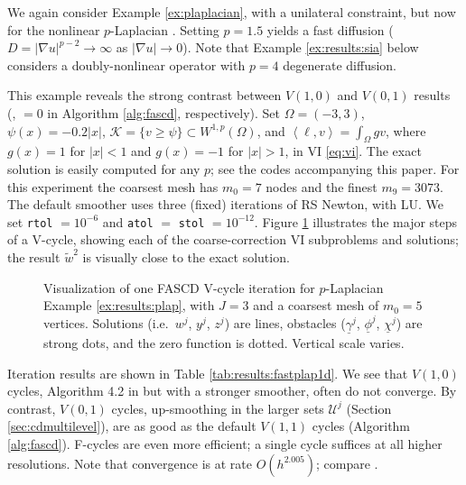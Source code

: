 \documentclass[review,hidelinks,onefignum,onetabnum]{siamart220329}
\newcommand{\grad}{\nabla}
\newcommand{\ip}[2]{\left<#1,#2\right>}
\begin{document}
\begin{example}  \label{ex:results:plap}
We again consider Example \ref{ex:plaplacian}, with a unilateral constraint, but now for the nonlinear $p$-Laplacian \cite{ChoeLewis1991}.  Setting $p=1.5$ yields a fast diffusion ($D=|\grad u|^{p-2}\to \infty$ as $|\grad u|\to 0$).  Note that Example \ref{ex:results:sia} below considers a doubly-nonlinear operator with $p=4$ degenerate diffusion.

This example reveals the strong contrast between $V(1,0)$ and $V(0,1)$ results (,  $=0$ in Algorithm \ref{alg:fascd}, respectively).  Set $\Omega=(-3,3)$, $\psi(x) = -0.2|x|$, $\mathcal{K} = \{v \ge \psi\} \subset W^{1,p}(\Omega)$, and $\ip\ell v = \int_\Omega g v$, where $g(x)=1$ for $|x|<1$ and $g(x)=-1$ for $|x|>1$, in VI \eqref{eq:vi}.  The exact solution is easily computed for any $p$; see the codes accompanying this paper.  For this experiment the coarsest mesh has $m_0=7$ nodes and the finest $m_9=3073$.  The default smoother uses three (fixed) iterations of RS Newton, with LU.  We set \texttt{rtol} $= 10^{-6}$ and \texttt{atol} $=$ \texttt{stol} $= 10^{-12}$.  Figure \ref{fig:imagesvcycle} illustrates the major steps of a V-cycle, showing each of the coarse-correction VI subproblems and solutions; the result $\tilde w^2$ is visually close to the exact solution.

\begin{figure}[ht]
\centering

\caption{Visualization of one FASCD V-cycle iteration for $p$-Laplacian Example \ref{ex:results:plap}, with $J=3$ and a coarsest mesh of $m_0=5$ vertices.  Solutions (i.e.~$w^j$, $y^j$, $z^j$) are lines, obstacles ($\underline{\gamma}^j$, $\underline{\phi}^j$, $\underline{\chi}^j$) are strong dots, and the zero function is dotted.  Vertical scale varies.}
\label{fig:imagesvcycle}
\end{figure}

Iteration results are shown in Table \ref{tab:results:fastplap1d}.  We see that $V(1,0)$ cycles, Algorithm 4.2 in \cite{GraeserKornhuber2009} but with a stronger smoother, often do not converge.  By contrast, $V(0,1)$ cycles, up-smoothing in the larger sets $\mathcal{U}^j$ (Section \ref{sec:cdmultilevel}), are as good as the default $V(1,1)$ cycles (Algorithm \ref{alg:fascd}).  F-cycles are even more efficient; a single cycle suffices at all higher resolutions.   Note that convergence is at rate $O(h^{2.005})$; compare \cite{ChoeLewis1991}.
\end{example}
\end{document}
